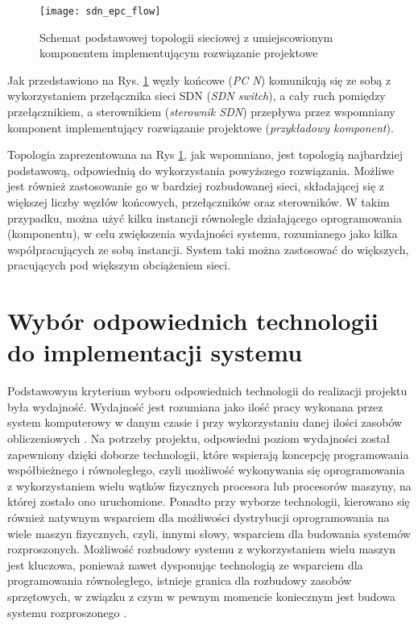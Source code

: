 \begin{figure}[h]
\centering
\texttt{[image: sdn\_epc\_flow]}
\caption{Schemat podstawowej topologii sieciowej z umiejscowionym komponentem
  implementującym rozwiązanie projektowe}
\label{fig:sdn_epc_flow}
\end{figure}

Jak przedstawiono na Rys. \ref{fig:sdn_epc_flow} węzły końcowe
(\textit{PC N}) komunikują się ze sobą z wykorzystaniem przełącznika sieci SDN
(\textit{SDN switch}), a cały ruch pomiędzy przełącznikiem, a sterownikiem
(\textit{sterownik SDN}) przepływa przez wspomniany komponent implementujący
rozwiązanie projektowe (\textit{przykładowy komponent}). 

Topologia zaprezentowana na Rys \ref{fig:sdn_epc_flow}, jak wspomniano, jest
topologią najbardziej podstawową, odpowiednią do wykorzystania powyższego
rozwiązania. Możliwe jest również zastosowanie go w bardziej
rozbudowanej sieci, składającej się z większej liczby węzłów końcowych, 
przełączników oraz sterowników. W takim przypadku, można użyć kilku instancji
równolegle działającego oprogramowania (komponentu), w celu zwiększenia
wydajności systemu, rozumianego jako kilka współpracujących ze sobą instancji.
System taki można zastosować do większych, pracujących pod większym obciążeniem
sieci.

\section{Wybór odpowiednich technologii do implementacji systemu}

Podstawowym kryterium wyboru odpowiednich technologii do realizacji projektu
była wydajność. Wydajność jest rozumiana jako ilość pracy wykonana przez system
komputerowy w danym czasie i przy wykorzystaniu danej ilości zasobów
obliczeniowych \cite{distrforfunandprof}. Na potrzeby projektu, odpowiedni
poziom wydajności został zapewniony dzięki doborze technologii, które wspierają
koncepcję programowania współbieżnego i równoległego, czyli możliwość
wykonywania się oprogramowania z wykorzystaniem wielu wątków fizycznych
procesora lub procesorów maszyny, na której zostało ono uruchomione.
Ponadto przy wyborze technologii, kierowano się również natywnym
wsparciem dla możliwości dystrybucji oprogramowania na wiele maszyn fizycznych,
czyli, innymi słowy, wsparciem dla budowania systemów rozproszonych. Możliwość
rozbudowy systemu z wykorzystaniem wielu maszyn jest kluczowa, ponieważ nawet
dysponując technologią ze wsparciem dla programowania równoległego, istnieje
granica dla rozbudowy zasobów sprzętowych, w związku z czym w pewnym momencie
koniecznym jest budowa systemu rozproszonego \cite{distrforfunandprof}.

